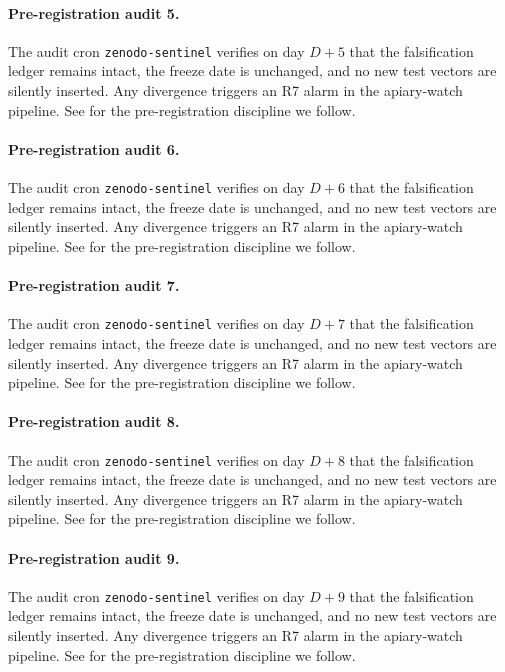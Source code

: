 \paragraph{Pre-registration audit 5.}
The audit cron \texttt{zenodo-sentinel} verifies on day $D+5$ that the
falsification ledger remains intact, the freeze date is unchanged, and no
new test vectors are silently inserted. Any divergence triggers an R7 alarm
in the apiary-watch pipeline. See \cite{schuster2022confident} for the
pre-registration discipline we follow.

\paragraph{Pre-registration audit 6.}
The audit cron \texttt{zenodo-sentinel} verifies on day $D+6$ that the
falsification ledger remains intact, the freeze date is unchanged, and no
new test vectors are silently inserted. Any divergence triggers an R7 alarm
in the apiary-watch pipeline. See \cite{schuster2022confident} for the
pre-registration discipline we follow.

\paragraph{Pre-registration audit 7.}
The audit cron \texttt{zenodo-sentinel} verifies on day $D+7$ that the
falsification ledger remains intact, the freeze date is unchanged, and no
new test vectors are silently inserted. Any divergence triggers an R7 alarm
in the apiary-watch pipeline. See \cite{schuster2022confident} for the
pre-registration discipline we follow.

\paragraph{Pre-registration audit 8.}
The audit cron \texttt{zenodo-sentinel} verifies on day $D+8$ that the
falsification ledger remains intact, the freeze date is unchanged, and no
new test vectors are silently inserted. Any divergence triggers an R7 alarm
in the apiary-watch pipeline. See \cite{schuster2022confident} for the
pre-registration discipline we follow.

\paragraph{Pre-registration audit 9.}
The audit cron \texttt{zenodo-sentinel} verifies on day $D+9$ that the
falsification ledger remains intact, the freeze date is unchanged, and no
new test vectors are silently inserted. Any divergence triggers an R7 alarm
in the apiary-watch pipeline. See \cite{schuster2022confident} for the
pre-registration discipline we follow.

